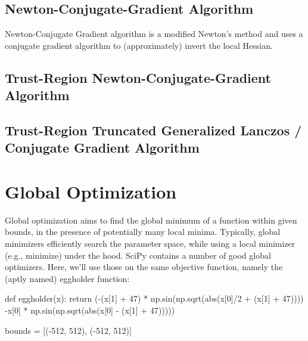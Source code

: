 \documentclass[
  letterpaper,
  DIV=11,
  numbers=noendperiod]{scrreprt}
\newenvironment{Shaded}{\begin{snugshade}}{\end{snugshade}}
\newcommand{\BuiltInTok}[1]{\textcolor[rgb]{0.00,0.23,0.31}{#1}}
\newcommand{\ControlFlowTok}[1]{\textcolor[rgb]{0.00,0.23,0.31}{#1}}
\newcommand{\DecValTok}[1]{\textcolor[rgb]{0.68,0.00,0.00}{#1}}
\newcommand{\KeywordTok}[1]{\textcolor[rgb]{0.00,0.23,0.31}{#1}}
\newcommand{\NormalTok}[1]{\textcolor[rgb]{0.00,0.23,0.31}{#1}}
\newcommand{\OperatorTok}[1]{\textcolor[rgb]{0.37,0.37,0.37}{#1}}
\begin{document}
\hypertarget{sec-newton-cg}{%
\subsection{Newton-Conjugate-Gradient Algorithm}\label{sec-newton-cg}}

Newton-Conjugate Gradient algorithm is a modified Newton's method and
uses a conjugate gradient algorithm to (approximately) invert the local
Hessian.

\hypertarget{sec-trust-region-newton}{%
\subsection{Trust-Region Newton-Conjugate-Gradient
Algorithm}\label{sec-trust-region-newton}}

\hypertarget{sec-trust-region-truncated}{%
\subsection{Trust-Region Truncated Generalized Lanczos / Conjugate
Gradient Algorithm}\label{sec-trust-region-truncated}}

\hypertarget{global-optimization}{%
\section{Global Optimization}\label{global-optimization}}

Global optimization aims to find the global minimum of a function within
given bounds, in the presence of potentially many local minima.
Typically, global minimizers efficiently search the parameter space,
while using a local minimizer (e.g., minimize) under the hood. SciPy
contains a number of good global optimizers. Here, we'll use those on
the same objective function, namely the (aptly named) eggholder
function:

\begin{Shaded}
\begin{Highlighting}[]
\KeywordTok{def}\NormalTok{ eggholder(x):}
    \ControlFlowTok{return}\NormalTok{ (}\OperatorTok{{-}}\NormalTok{(x[}\DecValTok{1}\NormalTok{] }\OperatorTok{+} \DecValTok{47}\NormalTok{) }\OperatorTok{*}\NormalTok{ np.sin(np.sqrt(}\BuiltInTok{abs}\NormalTok{(x[}\DecValTok{0}\NormalTok{]}\OperatorTok{/}\DecValTok{2} \OperatorTok{+}\NormalTok{ (x[}\DecValTok{1}\NormalTok{]  }\OperatorTok{+} \DecValTok{47}\NormalTok{))))}
            \OperatorTok{{-}}\NormalTok{x[}\DecValTok{0}\NormalTok{] }\OperatorTok{*}\NormalTok{ np.sin(np.sqrt(}\BuiltInTok{abs}\NormalTok{(x[}\DecValTok{0}\NormalTok{] }\OperatorTok{{-}}\NormalTok{ (x[}\DecValTok{1}\NormalTok{]  }\OperatorTok{+} \DecValTok{47}\NormalTok{)))))}

\NormalTok{bounds }\OperatorTok{=}\NormalTok{ [(}\OperatorTok{{-}}\DecValTok{512}\NormalTok{, }\DecValTok{512}\NormalTok{), (}\OperatorTok{{-}}\DecValTok{512}\NormalTok{, }\DecValTok{512}\NormalTok{)]}
\end{Highlighting}
\end{Shaded}
\end{document}
